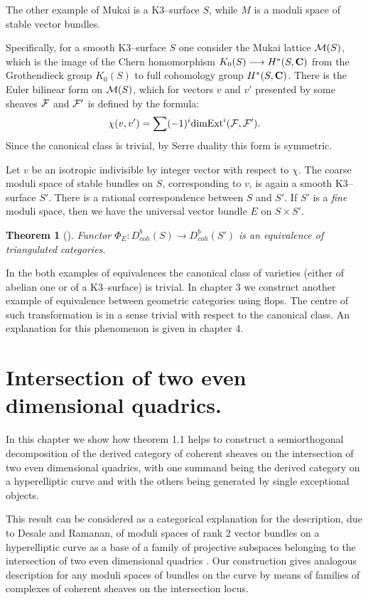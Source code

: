 \documentclass[12pt]{article}
\newtheorem{theorem}{Theorem}[section]
\def\db#1{ D^b_{coh}({#1})}
\def\lto{\longrightarrow}
\begin{document}
The other example of Mukai is a K3--surface $S$, while $M$ is a moduli space of stable vector bundles.

Specifically, for a smooth  K3--surface $S$ one consider the Mukai lattice ${\cal M}(S)$, which is the image of the Chern homomorphism $K_0(S)\lto H^*(S, {\bf C})$ from the Grothendieck
group $K_0(S)$ to full cohomology group $H^*(S, {\bf C})$. There is the Euler bilinear form on ${\cal M}(S)$, which for vectors $v$ and $v'$ presented by some sheaves ${\cal F}$ and
 ${\cal F'}$ is defined by the formula:
$$
\chi(v, v')= \sum (-1)^i {\rm dimExt}^i({\cal F, F'}).
$$
Since the canonical class is trivial, by Serre duality this form is symmetric.

Let $v$ be an isotropic indivisible by integer vector with respect to $\chi$. The coarse moduli space of stable bundles on $S$, corresponding to $v$, is again a smooth K3--surface $S'$. There is a rational correspondence between $S$ and $S'$. If $S'$ is a {\it fine}  moduli space, then we have the universal vector bundle $E$ on $S\times S'$.
\begin{theorem}[\cite{Mu2}]
Functor $\Phi_{E}:\db{S}\lto \db{S'}$ is an equivalence of triangulated categories.
\end{theorem}

In the both examples of equivalences the canonical class of varieties (either of abelian one or of a K3--surface) is trivial. In chapter 3 we construct another example of equivalence between geometric categories using flops. The centre of such transformation is in a sense trivial with respect to the canonical class. An explanation for this phenomenon
is given in chapter 4.

\section{Intersection of two even dimensional quadrics.}


In this chapter we show how theorem 1.1 helps to construct a semiorthogonal decomposition of the derived category of coherent sheaves on the intersection of two even dimensional quadrics, with one summand
being the derived category on a hyperelliptic curve and with the others being generated by single exceptional objects.

This result can be considered as a categorical explanation 
for the description, due to Desale and Ramanan, of moduli spaces of rank 2 vector bundles on a hyperelliptic curve as a base of a family of projective subspaces belonging to the intersection of two even dimensional quadrics \cite{DR}. Our construction gives analogous description for any moduli spaces of bundles on the curve by means of families of complexes of coherent sheaves on the intersection locus.
\end{document}
